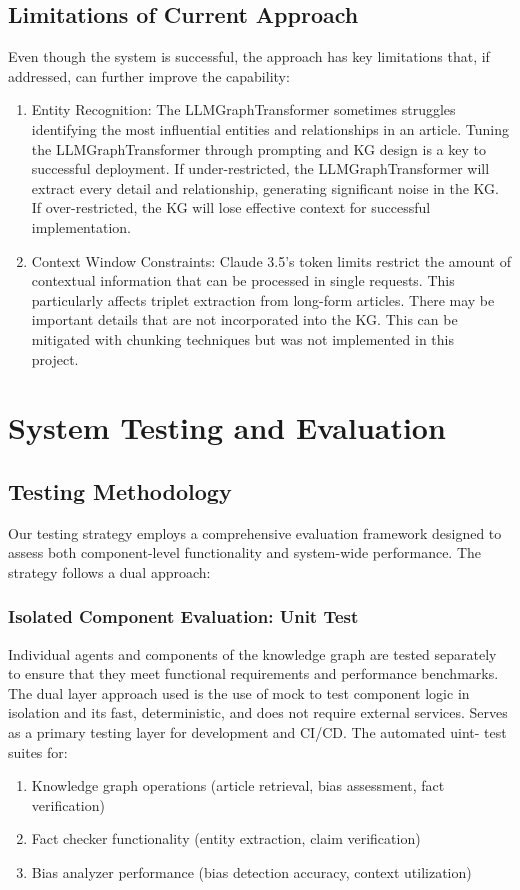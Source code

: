 \documentclass[11pt]{article}
\begin{document}
\subsection{Limitations of Current Approach}
Even though the system is successful, the approach has key limitations that, if addressed, can further improve the capability:
\begin{enumerate}
    \item Entity Recognition: The LLMGraphTransformer sometimes struggles identifying the most influential entities and relationships in an article. Tuning the LLMGraphTransformer through prompting and KG design is a key to successful deployment. If under-restricted, the LLMGraphTransformer will extract every detail and relationship, generating significant noise in the KG. If over-restricted, the KG will lose effective context for successful implementation.
    \item Context Window Constraints: Claude 3.5’s token limits restrict the amount of contextual information that can be processed in single requests. This particularly affects triplet extraction from long-form articles. There may be important details that are not incorporated into the KG. This can be mitigated with chunking techniques but was not implemented in this project. 
\end{enumerate}

\section{System Testing and Evaluation}
\subsection{Testing Methodology}
Our testing strategy employs a comprehensive evaluation framework designed to assess both component-level functionality and system-wide performance. The strategy follows a dual approach:
\subsubsection{Isolated Component Evaluation: Unit Test}
Individual agents and components of the knowledge graph are tested separately to ensure that they meet functional requirements and performance benchmarks. The dual layer approach used is the use of mock to test component logic in isolation and its fast, deterministic, and does not require external services. Serves as a primary testing layer for development and CI/CD. The automated uint- test suites for:
\begin{enumerate}
    \item Knowledge graph operations (article retrieval, bias assessment, fact verification)
    \item Fact checker functionality (entity extraction, claim verification)
    \item Bias analyzer performance (bias detection accuracy, context utilization)

\end{enumerate}
\end{document}
